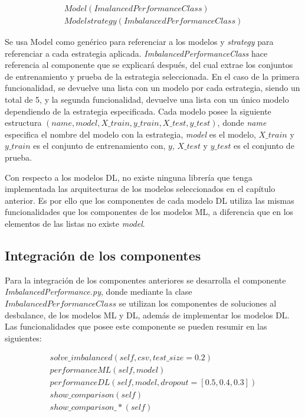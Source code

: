     \begin{align}
    	Model(ImalancedPerformanceClass)\\
    	Modelstrategy(ImbalancedPerformanceClass)
    \end{align}
    
    Se usa Model como gen\'{e}rico para referenciar a los modelos y \textit{strategy} para referenciar a cada estrategia aplicada. \textit{ImbalancedPerformanceClass} hace referencia al componente que se explicar\'{a} despu\'{e}s, del cual extrae los conjuntos de entrenamiento y prueba de la estrategia seleccionada. En el caso de la primera funcionalidad, se devuelve una lista con un modelo por cada estrategia, siendo un total de 5, y la segunda funcionalidad, devuelve una lista con un \'{u}nico modelo dependiendo de la estrategia especificada. Cada modelo posee la siguiente estructura $(name,model,X\_train,y\_train,X\_test,y\_test)$, donde \textit{name} especifica el nombre del modelo con la estrategia, \textit{model} es el modelo, $X\_train$ y $y\_train$ es el conjunto de entrenamiento con, $y$, $X\_test$ y $y\_test$ es el conjunto de prueba.
    
    Con respecto a los modelos DL, no existe ninguna librer\'{i}a que tenga implementada las arquitecturas de los modelos seleccionados en el cap\'{i}tulo anterior. Es por ello que los componentes de cada modelo DL utiliza las mismas funcionalidades que los componentes de los modelos ML, a diferencia que en los elementos de las listas no existe \textit{model}.
  
  \subsection{Integraci\'{o}n de los componentes}
    Para la integraci\'{o}n de los componentes anteriores se desarrolla el componente \textit{ImbalancedPerformance.py}, donde mediante la clase $ImbalancedPerformanceClass$ se utilizan los componentes de soluciones al desbalance, de los modelos ML y DL, adem\'{a}s de implementar los modelos DL. Las funcionalidades que posee este componente se pueden resumir en las siguientes:
    
  \begin{align}
  	solve\_imbalanced(self,csv,test\_size=0.2)\\ 
  	performanceML(self,model)\\
  	performanceDL(self,model,dropout=[0.5,0.4,0.3])\\
  	show\_comparison(self)\\ 
  	show\_comparison\_*(self)\\
  \end{align}
  
